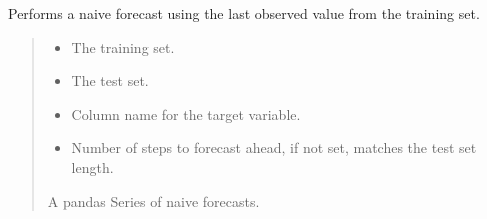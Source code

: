 \documentclass[letterpaper,10pt,english]{sphinxmanual}
\begin{document}
\begin{fulllineitems}
\label{\detokenize{docs/utilities:utilities.naive_forecast}}
\pysigstartsignatures
{}
\pysigstopsignatures
\sphinxAtStartPar
Performs a naive forecast using the last observed value from the training set.
\begin{quote}\begin{description}
\begin{itemize}
\item {} 
\sphinxAtStartPar
{} \textendash{} The training set.

\item {} 
\sphinxAtStartPar
{} \textendash{} The test set.

\item {} 
\sphinxAtStartPar
{} \textendash{} Column name for the target variable.

\item {} 
\sphinxAtStartPar
{} \textendash{} Number of steps to forecast ahead, if not set, matches the test set length.

\end{itemize}

\sphinxAtStartPar
A pandas Series of naive forecasts.

\end{description}\end{quote}

\end{fulllineitems}

\end{document}
